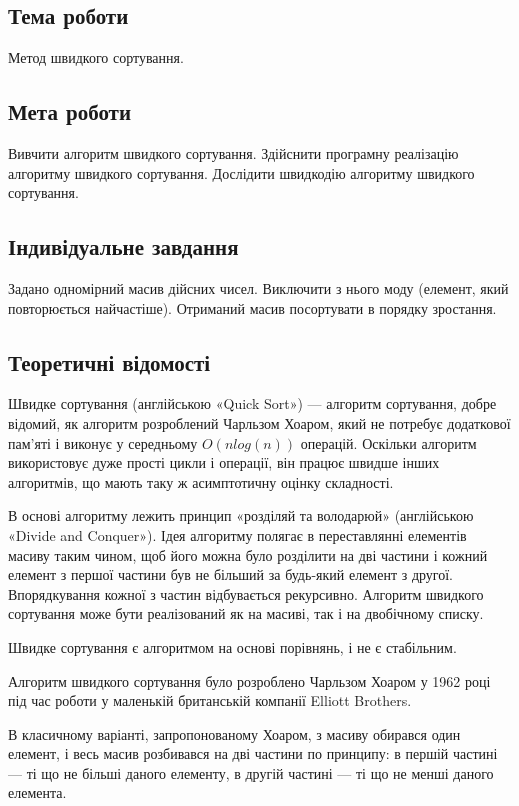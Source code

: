 \documentclass[12pt]{extarticle}
\begin{document}
\subsection*{Тема роботи} 
Метод швидкого сортування.



\subsection*{Мета роботи}  Вивчити алгоритм швидкого сортування. 
Здійснити програмну реалізацію алгоритму швидкого сортування. 
Дослідити швидкодію алгоритму швидкого сортування.

\subsection*{Індивідуальне завдання}
Задано одномірний масив дійсних чисел. Виключити з нього моду (елемент, який повторюється найчастіше). Отриманий масив посортувати в порядку зростання.

\subsection*{Теоретичні відомості}
Швидке сортування (англійською «Quick Sort») — алгоритм сортування, добре відомий, як алгоритм розроблений Чарльзом Хоаром, який не потребує додаткової пам’яті і виконує у середньому $O(n log(n))$ операцій. Оскільки алгоритм використовує дуже прості цикли і операції, він працює швидше інших алгоритмів, що мають таку ж асимптотичну оцінку складності.

В основі алгоритму лежить принцип «розділяй та володарюй» (англійською «Divide and Conquer»). Ідея алгоритму полягає в переставлянні елементів масиву таким чином, щоб його можна було розділити на дві частини і кожний елемент з першої частини був не більший за будь-який елемент з другої. Впорядкування кожної з частин відбувається рекурсивно. Алгоритм швидкого сортування може бути реалізований як на масиві, так і на двобічному списку.

Швидке сортування є алгоритмом на основі порівнянь, і не є стабільним.

Алгоритм швидкого сортування було розроблено Чарльзом Хоаром у 1962 році під час роботи у маленькій британській компанії Elliott Brothers.

В класичному варіанті, запропонованому Хоаром, з масиву обирався один елемент, і весь масив розбивався на дві частини по принципу: в першій частині — ті що не більші даного елементу, в другій частині — ті що не менші даного елемента.
\end{document}
